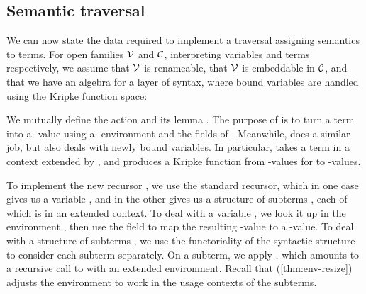 \subsection{Semantic traversal}\label{sec:traversal}

We can now state the data required to implement a traversal assigning
semantics to terms. For open families $\V$ and $\C$, interpreting
variables and terms respectively, we assume that $\V$ is renameable,
that $\V$ is embeddable in $\C$, and that we have an algebra for a
layer of syntax, where bound variables are handled using the Kripke
function space:




We mutually define the action  and its lemma
.
The purpose of  is to turn a term into a
\AgdaBound{$\C$}-value using a \AgdaBound{$\V$}-environment and the fields of
.
Meanwhile,  does a similar job, but also deals with
newly bound variables.
In particular,  takes a term in a context extended by
\AgdaBound{$\Theta$}, and produces a Kripke function from
\AgdaBound{$\V$}-values for \AgdaBound{$\Theta$} to \AgdaBound{$\C$}-values.


To implement the new recursor , we use the standard
recursor, which in one case gives us a variable , and in the other
gives us a structure of subterms , each of which is in an extended
context.
To deal with a variable , we look it
up in the environment \AgdaBound{$\rho$}, then use the
 field to map the resulting
\AgdaBound{$\V$}-value to a \AgdaBound{$\C$}-value.
To deal with a structure of subterms , we use the functoriality of
the syntactic structure to consider each subterm separately.
On a subterm, we apply , which amounts to a recursive call
to  with an extended environment.
Recall that  (\cref{thm:env-resize}) adjusts the
environment \AgdaBound{$\rho$} to work in the usage contexts of the subterms.

